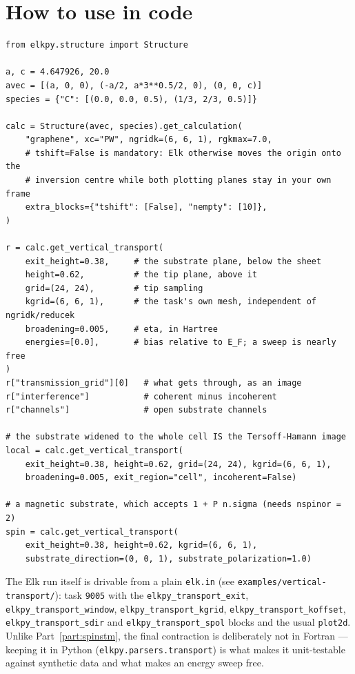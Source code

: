 \documentclass[11pt]{article}
\begin{document}
\section{How to use in code}

\begin{verbatim}
from elkpy.structure import Structure

a, c = 4.647926, 20.0
avec = [(a, 0, 0), (-a/2, a*3**0.5/2, 0), (0, 0, c)]
species = {"C": [(0.0, 0.0, 0.5), (1/3, 2/3, 0.5)]}

calc = Structure(avec, species).get_calculation(
    "graphene", xc="PW", ngridk=(6, 6, 1), rgkmax=7.0,
    # tshift=False is mandatory: Elk otherwise moves the origin onto the
    # inversion centre while both plotting planes stay in your own frame
    extra_blocks={"tshift": [False], "nempty": [10]},
)

r = calc.get_vertical_transport(
    exit_height=0.38,     # the substrate plane, below the sheet
    height=0.62,          # the tip plane, above it
    grid=(24, 24),        # tip sampling
    kgrid=(6, 6, 1),      # the task's own mesh, independent of ngridk/reducek
    broadening=0.005,     # eta, in Hartree
    energies=[0.0],       # bias relative to E_F; a sweep is nearly free
)
r["transmission_grid"][0]   # what gets through, as an image
r["interference"]           # coherent minus incoherent
r["channels"]               # open substrate channels

# the substrate widened to the whole cell IS the Tersoff-Hamann image
local = calc.get_vertical_transport(
    exit_height=0.38, height=0.62, grid=(24, 24), kgrid=(6, 6, 1),
    broadening=0.005, exit_region="cell", incoherent=False)

# a magnetic substrate, which accepts 1 + P n.sigma (needs nspinor = 2)
spin = calc.get_vertical_transport(
    exit_height=0.38, height=0.62, kgrid=(6, 6, 1),
    substrate_direction=(0, 0, 1), substrate_polarization=1.0)
\end{verbatim}

The Elk run itself is drivable from a plain \texttt{elk.in} (see
\texttt{examples/vertical-transport/}): task \texttt{9005} with the
\texttt{elkpy\_transport\_exit}, \texttt{elkpy\_transport\_window},
\texttt{elkpy\_transport\_kgrid}, \texttt{elkpy\_transport\_koffset},
\texttt{elkpy\_transport\_sdir} and \texttt{elkpy\_transport\_spol} blocks and
the usual \texttt{plot2d}. Unlike Part~\ref{part:spinstm}, the final
contraction is deliberately not in Fortran --- keeping it in Python
(\texttt{elkpy.parsers.transport}) is what makes it unit-testable against
synthetic data and what makes an energy sweep free.
\end{document}
